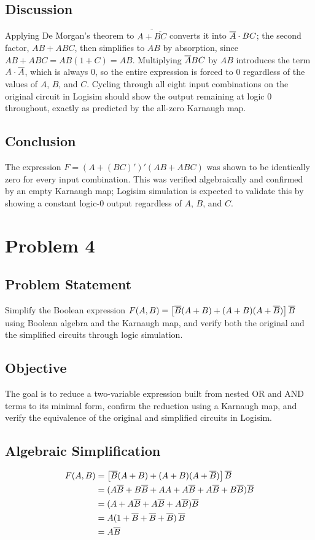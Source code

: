 \documentclass[12pt,a4paper]{article}
\begin{document}
\subsection*{Discussion}
Applying De Morgan's theorem to $\overline{A+\overline{BC}}$ converts it into $\overline{A} \cdot BC$; the second factor, $AB + ABC$, then simplifies to $AB$ by absorption, since $AB + ABC = AB(1+C) = AB$. Multiplying $\overline{A} BC$ by $AB$ introduces the term $A \cdot \overline{A}$, which is always 0, so the entire expression is forced to 0 regardless of the values of $A$, $B$, and $C$. Cycling through all eight input combinations on the original circuit in Logisim should show the output remaining at logic 0 throughout, exactly as predicted by the all-zero Karnaugh map.

\subsection*{Conclusion}
The expression $F = \left(A+(BC)'\right)'(AB+ABC)$ was shown to be identically zero for every input combination. This was verified algebraically and confirmed by an empty Karnaugh map; Logisim simulation is expected to validate this by showing a constant logic-0 output regardless of $A$, $B$, and $C$.

\clearpage
\section*{Problem 4}

\subsection*{Problem Statement}
Simplify the Boolean expression $F(A,B) = \left[\overline{B}(A+B) + (A+B)(A+\overline{B})\right]\overline{B}$ using Boolean algebra and the Karnaugh map, and verify both the original and the simplified circuits through logic simulation.

\subsection*{Objective}
The goal is to reduce a two-variable expression built from nested OR and AND terms to its minimal form, confirm the reduction using a Karnaugh map, and verify the equivalence of the original and simplified circuits in Logisim.

\subsection*{Algebraic Simplification}
\begin{align*}
F(A,B) &= \left[\overline{B}(A+B) + (A+B)(A+\overline{B})\right]\overline{B} \\
       &= (A\overline{B} + B\overline{B} + AA + A\overline{B} + A\overline{B} + B\overline{B})\overline{B} \\
       &= (A + A\overline{B} + A\overline{B} + A\overline{B})\overline{B} \\
       &= A(1 + \overline{B} + \overline{B} + \overline{B})\,\overline{B} \\
       &= A\overline{B}
\end{align*}
\end{document}
